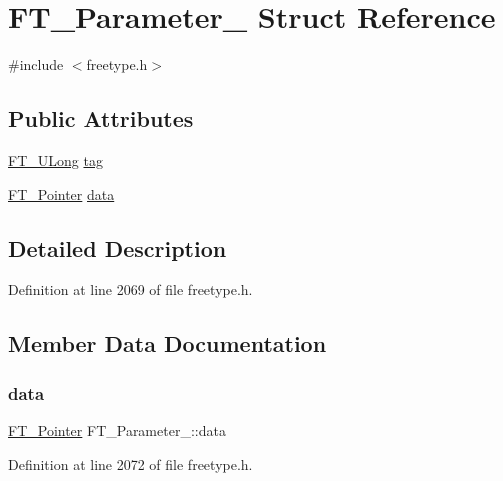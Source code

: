 \hypertarget{struct_f_t___parameter__}{}\section{F\+T\+\_\+\+Parameter\+\_\+ Struct Reference}
\label{struct_f_t___parameter__}


{\ttfamily \#include $<$freetype.\+h$>$}

\subsection*{Public Attributes}
\begin{DoxyCompactItemize}
\item 
\mbox{\hyperlink{fttypes_8h_a4fac88bdba78eb76b505efa6e4fbf3f5}{F\+T\+\_\+\+U\+Long}} \mbox{\hyperlink{struct_f_t___parameter___a5a53ef2652683a2cd9ee6a0a694cb76b}{tag}}
\item 
\mbox{\hyperlink{fttypes_8h_a00f9e6a0ddd7bc55f79b2f4b5b867266}{F\+T\+\_\+\+Pointer}} \mbox{\hyperlink{struct_f_t___parameter___a930c8885bd25be8d054443153c817c13}{data}}
\end{DoxyCompactItemize}


\subsection{Detailed Description}


Definition at line 2069 of file freetype.\+h.



\subsection{Member Data Documentation}
\mbox{\label{struct_f_t___parameter___a930c8885bd25be8d054443153c817c13}} 
\subsubsection{\texorpdfstring{data}{data}}
{\footnotesize\ttfamily \mbox{\hyperlink{fttypes_8h_a00f9e6a0ddd7bc55f79b2f4b5b867266}{F\+T\+\_\+\+Pointer}} F\+T\+\_\+\+Parameter\+\_\+\+::data}



Definition at line 2072 of file freetype.\+h.

\mbox{\label{struct_f_t___parameter___a5a53ef2652683a2cd9ee6a0a694cb76b}} 
